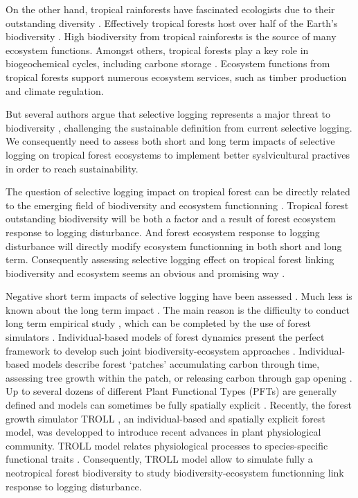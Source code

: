 \documentclass[12pt,]{article}
\theoremstyle{definition}
\theoremstyle{definition}
\theoremstyle{remark}
\begin{document}
On the other hand, tropical rainforests have fascinated ecologists due
to their outstanding diversity \citep{connell_diversity_1978}.
Effectively tropical forests host over half of the Earth's biodiversity
\citep{Scheffers2012}. High biodiversity from tropical rainforests is
the source of many ecosystem functions. Amongst others, tropical forests
play a key role in biogeochemical cycles, including carbone storage
\citep{Lewis2004}. Ecosystem functions from tropical forests support
numerous ecosystem services, such as timber production and climate
regulation.

But several authors argue that selective logging represents a major
threat to biodiversity
\citep{Carreno-Rocabado2012, DeAvila2015, Gibson2013, Martin2015, Zimmerman2012},
challenging the sustainable definition from current selective logging.
We consequently need to assess both short and long term impacts of
selective logging on tropical forest ecosystems to implement better
syslvicultural practives in order to reach sustainability.

The question of selective logging impact on tropical forest can be
directly related to the emerging field of biodiversity and ecosystem
functionning \citep{Loreau2000}. Tropical forest outstanding
biodiversity will be both a factor and a result of forest ecosystem
response to logging disturbance. And forest ecosystem response to
logging disturbance will directly modify ecosystem functionning in both
short and long term. Consequently assessing selective logging effect on
tropical forest linking biodiversity and ecosystem seems an obvious and
promising way \citep{Loreau2010}.

Negative short term impacts of selective logging have been assessed
\citetext{\citealp{Carreno-Rocabado2012}; \citealp{DeAvila2015}; \citealp[but
see][]{Martin2015}}. Much less is known about the long term impact
\citep{Osazuwa-Peters2015}. The main reason is the difficulty to conduct
long term empirical study \citep[but see][]{Herault2010}, which can be
completed by the use of forest simulators
\citep{Huth2004, Khler2004, Ruger2008, Tietjen2006}. Individual-based
models of forest dynamics present the perfect framework to develop such
joint biodiversity-ecosystem approaches \citep{Li}. Individual-based
models describe forest `patches' accumulating carbon through time,
assessing tree growth within the patch, or releasing carbon through gap
opening \citep{Bugmann2001}. Up to several dozens of different Plant
Functional Types (PFTs) are generally defined and models can sometimes
be fully spatially explicit \citep{Pacala1996}. Recently, the forest
growth simulator TROLL \citep{Chave1999}, an individual-based and
spatially explicit forest model, was developped to introduce recent
advances in plant physiological community. TROLL model relates
physiological processes to species-specific functional traits
\citep{Li}. Consequently, TROLL model allow to simulate fully a
neotropical forest biodiversity to study biodiversity-ecosystem
functionning link response to logging disturbance.
\end{document}
